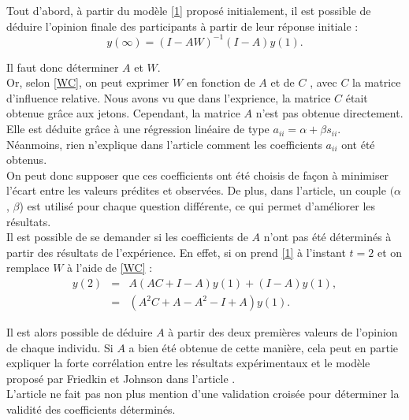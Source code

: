 \documentclass{scrreprt}
\begin{document}
\begin{multicols}{2}
Tout d’abord, à partir du modèle \eqref{1} proposé initialement, il est possible de déduire l'opinion finale des participants à partir de leur réponse initiale :\\

\begin{equation}
\label{4}
y(\infty) =(I-AW)^{-1}(I-A)y(1).
\end{equation}

Il faut donc déterminer $A$ et $W$.\\

Or, selon \eqref{WC}, on peut exprimer $W$ en fonction de $A$ et de $C$ , avec $C$ la matrice d’influence relative. Nous avons vu que dans l'exprience, la matrice $C$ était obtenue grâce aux jetons. Cependant, la matrice $A$ n'est pas obtenue directement. Elle est déduite grâce à une régression linéaire de type $a_{ii} = \alpha + \beta s_{ii}$.\\

Néanmoins, rien n’explique dans l’article comment les coefficients $a_{ii}$ ont été obtenus.\\

On peut donc supposer que ces coefficients ont été choisis de façon à minimiser l'écart entre les valeurs prédites et observées. De plus, dans l'article, un couple $(\alpha$, $\beta$) est utilisé pour chaque question différente, ce qui permet d'améliorer les résultats.\\

Il est possible de se demander si les coefficients de $A$ n'ont pas été déterminés à partir des résultats de l'expérience. En effet, si on prend \eqref{1} à l’instant $t=2$ et on remplace $W$ à l’aide de \eqref{WC} :\\

\begin{align}
y(2) & = & A(AC+I-A)y(1)+(I-A)y(1), \\ 
& = & (A^{2}C+A-A^{2}-I+A)y(1).
\end{align}

Il est alors possible de déduire $A$ à partir des deux premières valeurs de l'opinion de chaque individu. Si $A$ a bien été obtenue de cette manière, cela peut en partie expliquer la forte corrélation entre les résultats expérimentaux et le modèle proposé par Friedkin et Johnson dans l'article \cite{FJ}.\\

L'article ne fait pas non plus mention d'une validation croisée pour déterminer la validité des coefficients déterminés.\\


\end{multicols}
\end{document}
